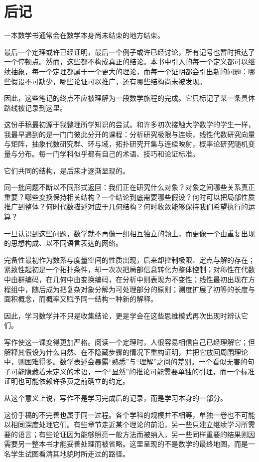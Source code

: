 \cleardoublepage
\chapter*{后记}
\thispagestyle{empty}

一本数学书通常会在数学本身尚未结束的地方结束。

最后一个定理或许已经证明，最后一个例子或许已经讨论，所有记号也暂时抵达了一个停顿点。然而，这些都不构成真正的结论。本书中引入的每一个定义都可以继续抽象，每一个定理都属于一个更大的理论，而每一个证明都会引出新的问题：哪些假设不可缺少，哪些论证可以推广，还有哪些结构尚未被发现。

因此，这些笔记的终点不应被理解为一段数学旅程的完成。它只标记了某一条具体路线被记录到这里。

这份手稿最初源于我整理所学知识的尝试。和许多初次接触大学数学的学生一样，我最早遇到的是一门门彼此分开的课程：分析研究极限与连续，线性代数研究向量与矩阵，抽象代数研究群、环与域，拓扑研究开集与连续映射，概率论研究随机变量与分布。每一门学科似乎都有自己的术语、技巧和论证标准。

它们共同的结构，是后来才逐渐显现的。

同一批问题不断以不同形式返回：我们正在研究什么对象？对象之间哪些关系真正重要？哪些变换保持相关结构？一个结论到底需要哪些假设？何时可以把局部性质推广到整体？何时代数描述对应于几何结构？何时收敛能够保持我们希望执行的运算？

一旦认识到这些问题，数学就不再像一组相互独立的领土，而更像一个由重复出现的思想构成、以不同语言表达的网络。

完备性最初作为数系与度量空间的性质出现，后来却控制极限、定点与解的存在；紧致性起初是一个拓扑条件，却一次次把局部信息转化为整体控制；对称性在代数中由群编码，在几何中由变换编码，在分析中则表现为不变性；线性最初出现在方程组中，随后成为把复杂对象分解为可处理部分的原则；测度扩展了初等的长度与面积概念，而概率又赋予同一结构一种新的解释。

因此，学习数学并不只是收集结论，更是学会在这些思维模式再次出现时辨认它们。

写作使这一课变得更加严格。阅读一个定理时，人很容易相信自己已经理解它；但解释其假设为什么自然、在不隐藏步骤的情况下重构证明，并把它放回周围理论中，则困难得多。数学表述会暴露“熟悉”与“理解”之间的差别。一个看似无害的句子可能隐藏着未定义的术语，一个“显然”的推论可能需要单独的引理，而一个标准证明也可能依赖许多页之前确立的约定。

从这个意义上说，写作不是学习完成后的记录，而是学习本身的一部分。

这份手稿的不完善也属于同一过程。各个学科的规模并不相等，单独一卷也不可能以相同深度处理它们。有些章节走近某个理论的前沿，另一些只建立继续学习所需要的语言；有些论证因为能够照亮一般方法而被纳入，另一些同样重要的结果则因需要另一整本书才能妥善处理而被省略。这里呈现的不是数学的最终地图，而是一名学生试图看清其地貌时所走过的路径。

